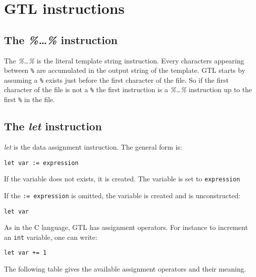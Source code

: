 \documentclass[11pt]{article}
\begin{document}
{\section{GTL instructions}

\subsection{The {\em \%\ldots\%} instruction}

The {\em \%\ldots\%} is the literal template string instruction. Every characters appearing between \lstinline{%} are accumulated in the output string of the template. GTL starts by assuming a \lstinline{%} exists just before the first character of the file. So if the first character of the file is not a \lstinline{%} the first instruction is a {\em \%\ldots\%} instruction up to the first \lstinline{%} in the file. 

\subsection{The {\em let} instruction}

{\em let} is the data assignment instruction. The general form is:

\begin{lstlisting}
let var := expression
\end{lstlisting}

If the variable does not exists, it is created. The variable is set to \lstinline{expression}

If the \lstinline{:= expression} is omitted, the variable is created and is unconstructed:

\begin{lstlisting}
let var
\end{lstlisting}


As in the C language, GTL has assignment operators. For instance to increment an \lstinline{int} variable, one can write: 

\begin{lstlisting}
let var += 1
\end{lstlisting}

The following table gives the available assignment operators and their meaning.

}
\end{document}
